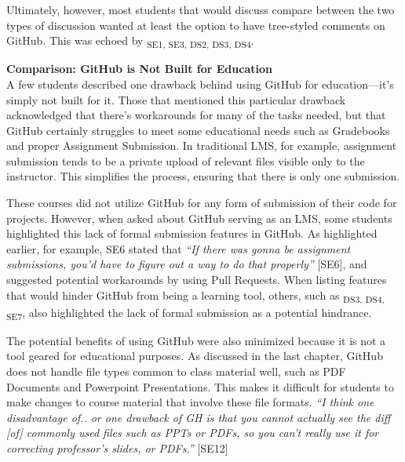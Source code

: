 
Ultimately, however, most students that would discuss compare between the two types of discussion wanted at least the option to have tree-styled comments on GitHub. This was echoed by \textsubscript{SE1, SE3, DS2, DS3, DS4}.

\textbf{Comparison: GitHub is Not Built for Education} \\
A few students described one drawback behind using GitHub for education---it's simply not built for it. Those that mentioned this particular drawback acknowledged that there's workarounds for many of the tasks needed, but that GitHub certainly struggles to meet some educational needs such as Gradebooks and proper Assignment Submission. In traditional LMS, for example, assignment submission tends to be a private upload of relevant files visible only to the instructor. This simplifies the process, ensuring that there is only one submission.

These courses did not utilize GitHub for any form of submission of their code for projects. However, when asked about GitHub serving as an LMS, some students highlighted this lack of formal submission features in GitHub. As highlighted earlier, for example, SE6 stated that \textit{``If there was gonna be assignment submissions, you'd have to figure out a way to do that properly''} [SE6], and suggested potential workarounds by using Pull Requests. When listing features that would hinder GitHub from being a learning tool, others, such as \textsubscript{DS3, DS4, SE7}, also highlighted the lack of formal submission as a potential hindrance.

The potential benefits of using GitHub were also minimized because it is not a tool geared for educational purposes. As discussed in the last chapter, GitHub does not handle file types common to class material well, such as PDF Documents and Powerpoint Presentations. This makes it difficult for students to make changes to course material that involve these file formats. \textit{``I think one disadvantage of.. or one drawback of GH is that you cannot actually see the diff [of] commonly used files such as PPTs or PDFs, so you can't really use it for correcting professor's slides, or PDFs.''} [SE12]

